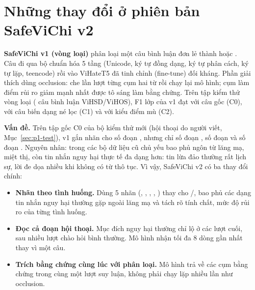 
\section{Những thay đổi ở phiên bản SafeViChi v2}
\label{sec:p1-v1v2}

\textbf{SafeViChi v1 (vòng loại)} phân loại một câu bình luận đơn lẻ thành  hoặc . Câu đi qua bộ chuẩn hóa
5 tầng (Unicode, ký tự đồng dạng, ký tự phân cách, ký tự lặp, teencode) rồi vào ViHateT5 đã tinh chỉnh
(fine-tune) đối kháng. Phần giải thích dùng occlusion: che lần lượt từng cụm hai từ rồi chạy lại mô hình;
cụm làm điểm rủi ro giảm mạnh nhất được tô sáng làm bằng chứng. Trên tập kiểm thử vòng loại
( câu bình luận ViHSD/ViHOS), F1 lớp  của v1 đạt  với câu gốc
(C0),  với câu biến dạng né lọc (C1) và  với kiểu điểm mù (C2).

\textbf{Vấn đề.} Trên tập gốc C0 của bộ kiểm thử mới (hội thoại do người viết,
Mục~\ref{sec:p1-test}), v1 gắn nhãn  cho  số đoạn , nhưng chỉ
 số đoạn ,  số đoạn  và  số đoạn
. Nguyên nhân:  trong các bộ dữ liệu cũ chủ yếu bao phủ ngôn từ lăng mạ,
miệt thị, còn tin nhắn nguy hại thực tế đa dạng hơn: tin lừa đảo thường rất lịch sự, lời
đe dọa nhiều khi không có từ thô tục. Vì vậy, SafeViChi v2 có ba thay đổi chính:

\begin{itemize}
  \item \textbf{Nhãn theo tình huống.} Dùng 5 nhãn (, , , ,
        ) thay cho /, bao phủ các dạng tin nhắn
        nguy hại thường gặp ngoài lăng mạ và tách rõ tính chất, mức độ rủi ro của từng tình huống.
  \item \textbf{Đọc cả đoạn hội thoại.} Mục đích nguy hại thường chỉ lộ ở các lượt cuối, sau nhiều lượt chào hỏi
        bình thường. Mô hình nhận tối đa 8 dòng gần nhất thay vì một câu.
  \item \textbf{Trích bằng chứng cùng lúc với phân loại.} Mô hình trả về các cụm bằng chứng trong
        cùng một lượt suy luận, không phải chạy lặp nhiều lần như occlusion.
\end{itemize}

